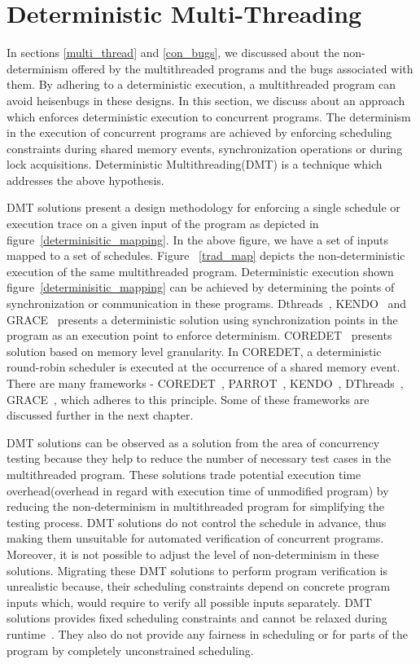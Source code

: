 \section{Deterministic Multi-Threading \label{sec_dmt}}

In sections \ref{multi_thread} and \ref{con_bugs}, we discussed about the non-determinism offered by the multithreaded programs and the bugs associated with them. 
By adhering to a deterministic execution, a multithreaded program can avoid heisenbugs in these designs. 
In this section, we discuss about an approach which enforces deterministic execution to concurrent programs. 
The determinism in the execution of concurrent programs are achieved by enforcing scheduling constraints during shared memory events, synchronization operations or during lock acquisitions. 
Deterministic Multithreading(DMT) is a technique which addresses the above hypothesis. 

DMT solutions present a design methodology for enforcing a single schedule or execution trace on a given input of the program as depicted in figure~\ref{determinisitic_mapping}. 
In the above figure, we have a set of inputs mapped to a set of schedules. 
Figure~ \ref{trad_map} depicts the non-deterministic execution of the same multithreaded program. 
Deterministic execution shown figure~\ref{determinisitic_mapping} can be achieved by determining the points of synchronization or communication in these programs. 
Dthreads~\citep{dthreads}, KENDO~\citep{kendo} and GRACE~\citep{grace} presents a deterministic solution using synchronization points in the program as an execution point to enforce determinism. 
COREDET~\citep{coredet} presents solution based on memory level granularity. 
In COREDET, a deterministic round-robin scheduler is executed at the occurrence of a shared memory event. 
There are many frameworks - COREDET~\citep{coredet}, PARROT~\citep{parrot}, KENDO~\citep{kendo}, DThreads~\citep{dthreads}, GRACE~\citep{grace}, which adheres to this principle. 
Some of these frameworks are discussed further in the next chapter. 

DMT solutions can be observed as a solution from the area of concurrency testing because they help to reduce the number of necessary test cases in the multithreaded program. 
These solutions trade potential execution time overhead(overhead in regard with execution time of unmodified program) by reducing the non-determinism in multithreaded program for simplifying the testing process. 
DMT solutions do not control the schedule in advance, thus making them unsuitable for automated verification of concurrent programs. 
Moreover, it is not possible to adjust the level of non-determinism in these solutions. 
Migrating these DMT solutions to perform program verification is unrealistic because, their scheduling constraints depend on concrete program inputs which, would require to verify all possible inputs separately. 
DMT solutions provides fixed scheduling constraints and cannot be relaxed during runtime~\citep{metzler2017quick}. 
They also do not provide any fairness in scheduling or for parts of the program by completely unconstrained scheduling. 



